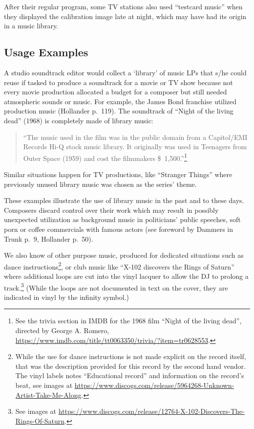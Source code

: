 \documentclass[a4paper,
fontsize=11pt,
oneside,
numbers=noperiodatend,
parskip=half-,
bibliography=totoc,
final
]{scrartcl}
\begin{document}
After their regular program, some TV stations also used
\enquote{testcard music} when they displayed the calibration image late
at night, which may have had its origin in a music library.

\hypertarget{usage-examples}{%
\subsection{Usage Examples}\label{usage-examples}}

A studio soundtrack editor would collect a \enquote*{library} of music
LPs that s/he could reuse if tasked to produce a soundtrack for a movie
or TV show because not every movie production allocated a budget for a
composer but still needed atmospheric sounds or music. For example, the
James Bond franchise utilized production music (Hollander p.~119). The
soundtrack of \enquote{Night of the living dead} (1968) is completely
made of library music:

\begin{quote}
\enquote{The music used in the film was in the public domain from a
Capitol/EMI Records Hi-Q stock music library. It originally was used in
Teenagers from Outer Space (1959) and cost the filmmakers
\$~1,500.}\footnote{See the trivia section in IMDB for the 1968 film
  \enquote{Night of the living dead}, directed by George A. Romero,
  \url{https://www.imdb.com/title/tt0063350/trivia/?item=tr0628553}.}
\end{quote}

Similar situations happen for TV productions, like \enquote{Stranger
Things} where previously unused library music was chosen as the series'
theme.

These examples illustrate the use of library music in the past and to
these days. Composers discard control over their work which may result
in possibly unexpected utilization as background music in politicians'
public speeches, soft porn or coffee commercials with famous actors (see
foreword by Dammers in Trunk p.~9, Hollander p.~50).

We also know of other purpose music, produced for dedicated situations
such as dance instructions\footnote{While the use for dance instructions
  is not made explicit on the record itself, that was the description
  provided for this record by the second hand vendor. The vinyl labels
  notes \enquote{Educational record} and information on the record's
  beat, see images at
  \url{https://www.discogs.com/release/5964268-Unknown-Artist-Take-Me-Along}.},
or club music like \enquote{X-102 discovers the Rings of Saturn} where
additional loops are cut into the vinyl lacquer to allow the DJ to
prolong a track.\footnote{See images at
  \url{https://www.discogs.com/release/12764-X-102-Discovers-The-Rings-Of-Saturn}.}
(While the loops are not documented in text on the cover, they are
indicated in vinyl by the infinity symbol.)
\end{document}
